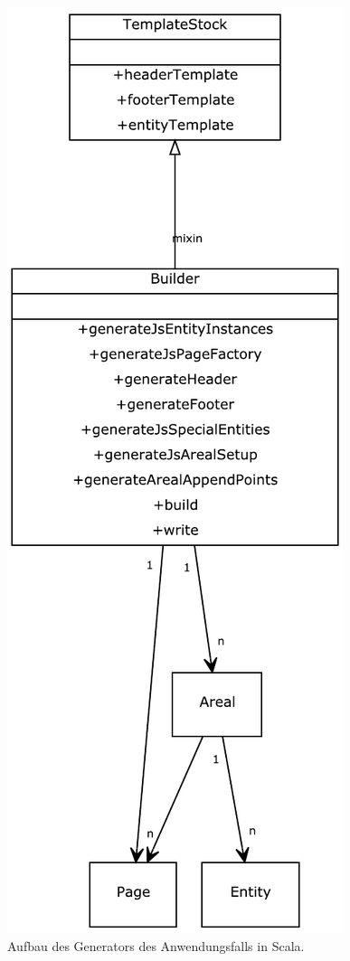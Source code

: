 \begin{figure}[h!]
  \centering
    \includegraphics[height=0.8\textheight]{figures/uml_generator.pdf}
  \caption{Aufbau des Generators des Anwendungsfalls in Scala.}\label{fig-uml_generator}
\end{figure}

